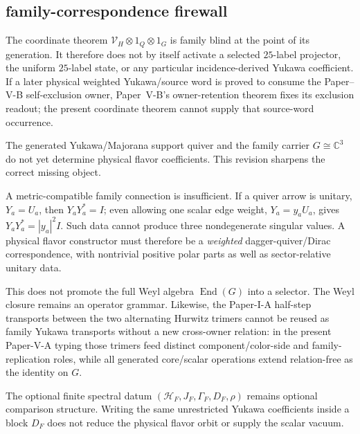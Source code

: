 \documentclass[12pt,a4paper]{article}
\begin{document}
\subsection{family-correspondence firewall}

\begin{remark}
\label{p5:rem:v181-higgs-label-owner-firewall}
The coordinate theorem
\(\mathcal V_H\otimes1_Q\otimes1_G\) is family blind at the point of its
generation.  It therefore does not by itself activate a selected
$25$-label projector, the uniform $25$-label state, or any particular
incidence-derived Yukawa coefficient.  If a later physical weighted
Yukawa/source word is proved to consume the Paper--V-B self-exclusion owner,
Paper~V-B's owner-retention theorem fixes its exclusion readout; the present
coordinate theorem cannot supply that source-word occurrence.
\end{remark}

\label{p5:sec:post-v125-family-correspondence}

The generated Yukawa/Majorana support quiver and the family carrier
$G\cong\mathbb C^3$ do not yet determine physical flavor coefficients.  This
revision sharpens the correct missing object.

A metric-compatible family connection is insufficient.  If a quiver arrow is
unitary, $Y_a=U_a$, then $Y_aY_a^*=I$; even allowing one scalar edge weight,
$Y_a=y_aU_a$, gives $Y_aY_a^*=|y_a|^2I$.  Such data cannot produce three
nondegenerate singular values.  A physical flavor constructor must therefore
be a \emph{weighted} dagger-quiver/Dirac correspondence, with nontrivial
positive polar parts as well as sector-relative unitary data.

This does not promote the full Weyl algebra $\operatorname{End}(G)$ into a
selector.  The Weyl closure remains an operator grammar.  Likewise, the
Paper-I-A half-step transports between the two alternating Hurwitz trimers
cannot be reused as family Yukawa transports without a new cross-owner
relation: in the present Paper-V-A typing those trimers feed distinct
component/color-side and family-replication roles, while all generated
core/scalar operations extend relation-free as the identity on $G$.

The optional finite spectral datum $(\mathcal H_F,J_F,\Gamma_F,D_F,\rho)$
remains optional comparison structure.  Writing the same unrestricted Yukawa
coefficients inside a block $D_F$ does not reduce the physical flavor orbit or
supply the scalar vacuum.
\end{document}
